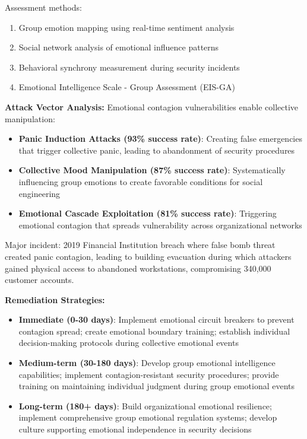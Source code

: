 \documentclass[11pt,a4paper]{article}
\begin{document}
Assessment methods:
\begin{enumerate}
\item Group emotion mapping using real-time sentiment analysis
\item Social network analysis of emotional influence patterns
\item Behavioral synchrony measurement during security incidents
\item Emotional Intelligence Scale - Group Assessment (EIS-GA)
\end{enumerate}

\textbf{Attack Vector Analysis:}
Emotional contagion vulnerabilities enable collective manipulation:
\begin{itemize}
\item \textbf{Panic Induction Attacks (93\% success rate)}: Creating false emergencies that trigger collective panic, leading to abandonment of security procedures
\item \textbf{Collective Mood Manipulation (87\% success rate)}: Systematically influencing group emotions to create favorable conditions for social engineering
\item \textbf{Emotional Cascade Exploitation (81\% success rate)}: Triggering emotional contagion that spreads vulnerability across organizational networks
\end{itemize}

Major incident: 2019 Financial Institution breach where false bomb threat created panic contagion, leading to building evacuation during which attackers gained physical access to abandoned workstations, compromising 340,000 customer accounts.

\textbf{Remediation Strategies:}
\begin{itemize}
\item \textbf{Immediate (0-30 days)}: Implement emotional circuit breakers to prevent contagion spread; create emotional boundary training; establish individual decision-making protocols during collective emotional events
\item \textbf{Medium-term (30-180 days)}: Develop group emotional intelligence capabilities; implement contagion-resistant security procedures; provide training on maintaining individual judgment during group emotional events
\item \textbf{Long-term (180+ days)}: Build organizational emotional resilience; implement comprehensive group emotional regulation systems; develop culture supporting emotional independence in security decisions
\end{itemize}
\end{document}
